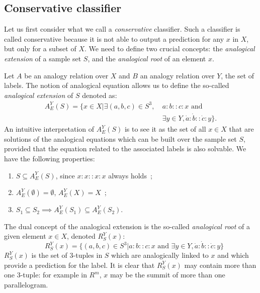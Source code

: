 \documentclass{ecai}
\begin{document}
\subsection{Conservative classifier}
\label{conservative}

Let us first consider what we call a \textit{conservative}
classifier. Such a classifier is called conservative because it
is not able to output a prediction for any $x$ in $X$, but only for a subset of
$X$. We need to define two crucial concepts: the \textit{analogical extension} of
a sample set $S$, and the \textit{analogical root} of an element $x$.

Let $A$ be an analogy relation over $X$ and $B$ an analogy relation over $Y$, the set of labels.
The notion of analogical equation allows us to define the so-called {\it
analogical extension} of $S$ denoted as:
\begin{align*}
  A_E^Y(S)=\{ x \in X | \exists (a,b,c) \in S^3, ~ & a:b::c:x \mbox{ and }\\
& \exists y \in Y, \dot{a}:\dot{b}::\dot{c}:y\}.
\end{align*}
An intuitive interpretation of $A_E^Y(S)$ is to see it as the set of all $x \in
X$ that are solutions of the analogical equations which can be built over the
sample set $S$, provided that the equation related to the associated labels is also solvable.
We have the following properties:
\begin{enumerate}
\item $S \subseteq A_E^Y(S)$, since $x:x::x:x$ always holds~;
\item$A_E^Y(\emptyset)=\emptyset$, $A_E^Y(X)=X$~;
\item $S_1 \subseteq S_2 \implies A_E^Y(S_1) \subseteq A_E^Y(S_2)$.
\end{enumerate}

The dual concept of the analogical extension is the so-called {\it analogical
root} of a given element $x \in X$, denoted $R_{S}^Y(x)$:
$$\quad R_{S}^Y(x) = \{(a, b, c) \in S^3 | a:b::c:x \mbox{ and } \exists
y \in Y, \dot{a}:\dot{b}::\dot{c}:y\}$$
$R_{S}^Y(x)$ is the set of 3-tuples in $S$ which are analogically linked to
$x$ and which provide a prediction for the label. It is clear that $R_{S}^Y(x)$ may contain more than one 3-tuple: for
example in $R^m$, $x$ may be the summit of more than one parallelogram.
\end{document}
